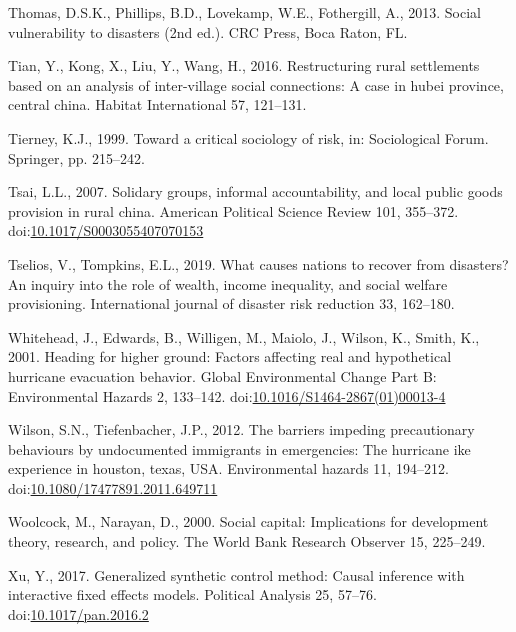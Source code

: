 \documentclass[]{elsarticle} %
\newlength{\cslhangindent}
\newlength{\cslentryspacingunit} %
\newenvironment{CSLReferences}[2] %
 {%
  \setlength{\parindent}{0pt}
  \ifodd #1
  \let\oldpar\par
  \def\par{\hangindent=\cslhangindent\oldpar}
  \fi
  \setlength{\parskip}{#2\cslentryspacingunit}
 }%
 {}
\begin{document}
\begin{CSLReferences}{1}{0}
\leavevmode{}%
Thomas, D.S.K., Phillips, B.D., Lovekamp, W.E., Fothergill, A., 2013.
Social vulnerability to disasters (2nd ed.). CRC Press, Boca Raton, FL.

\leavevmode{}%
Tian, Y., Kong, X., Liu, Y., Wang, H., 2016. Restructuring rural
settlements based on an analysis of inter-village social connections: A
case in hubei province, central china. Habitat International 57,
121--131.

\leavevmode{}%
Tierney, K.J., 1999. Toward a critical sociology of risk, in:
Sociological Forum. Springer, pp. 215--242.

\leavevmode{}%
Tsai, L.L., 2007. Solidary groups, informal accountability, and local
public goods provision in rural china. American Political Science Review
101, 355--372.
doi:\href{https://doi.org/10.1017/S0003055407070153}{10.1017/S0003055407070153}

\leavevmode{}%
Tselios, V., Tompkins, E.L., 2019. What causes nations to recover from
disasters? An inquiry into the role of wealth, income inequality, and
social welfare provisioning. International journal of disaster risk
reduction 33, 162--180.

\leavevmode{}%
Whitehead, J., Edwards, B., Willigen, M., Maiolo, J., Wilson, K., Smith,
K., 2001. Heading for higher ground: Factors affecting real and
hypothetical hurricane evacuation behavior. Global Environmental Change
Part B: Environmental Hazards 2, 133--142.
doi:\href{https://doi.org/10.1016/S1464-2867(01)00013-4}{10.1016/S1464-2867(01)00013-4}

\leavevmode{}%
Wilson, S.N., Tiefenbacher, J.P., 2012. The barriers impeding
precautionary behaviours by undocumented immigrants in emergencies: The
hurricane ike experience in houston, texas, USA. Environmental hazards
11, 194--212.
doi:\href{https://doi.org/10.1080/17477891.2011.649711}{10.1080/17477891.2011.649711}

\leavevmode{}%
Woolcock, M., Narayan, D., 2000. Social capital: Implications for
development theory, research, and policy. The World Bank Research
Observer 15, 225--249.

\leavevmode{}%
Xu, Y., 2017. Generalized synthetic control method: Causal inference
with interactive fixed effects models. Political Analysis 25, 57--76.
doi:\href{https://doi.org/10.1017/pan.2016.2}{10.1017/pan.2016.2}


\end{CSLReferences}
\end{document}
